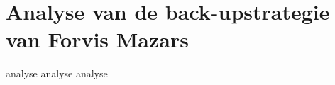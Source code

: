\chapter{Analyse van de back-upstrategie van Forvis Mazars}%
\label{ch:analyse}
analyse analyse analyse